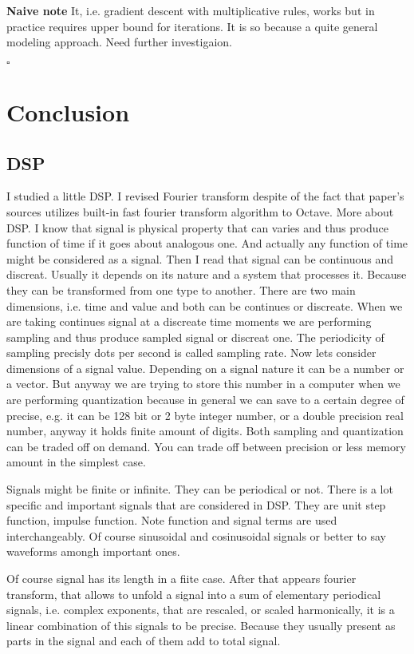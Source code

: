 \documentclass[oneside, final, 14pt]{extarticle}
\begin{document}
\textbf{Naive note}
It, i.e. gradient descent with multiplicative rules,
works but in practice requires
upper bound for iterations. It is so
because a quite general modeling approach.
Need further investigaion.

$\square$

\section{Conclusion}

\subsection{DSP}

	I studied a little DSP. I revised Fourier transform despite of the fact
that paper's sources utilizes built-in fast fourier transform algorithm to
Octave. More about DSP. I know that signal is physical property that can varies
and thus produce function of time if it goes about analogous one. And actually
any function of time might be considered as a signal. Then I read that signal
can be continuous and discreat. Usually it depends on its nature and a system
that processes it. Because they can be transformed from one type to another.
There are two main dimensions, i.e. time and value and both can be continues or
discreate. When we are taking continues signal at a discreate time moments we
are performing sampling and thus produce sampled signal or discreat one. The
periodicity of sampling precisly dots per second is called sampling rate. Now
lets consider dimensions of a signal value. Depending on a signal nature it can
be a number or a vector. But anyway we are trying to store this number in a
computer when we are performing quantization because in general we can save to
a certain degree of precise, e.g. it can be 128 bit or 2 byte integer number,
or a double precision real number, anyway it holds finite amount of digits.
Both sampling and quantization can be traded off on demand. You can trade off
between precision or less memory amount in the simplest case.

Signals might be finite or infinite. They can be periodical or not. There is a
lot specific and important signals that are considered in DSP. They are unit
step function, impulse function. Note function and signal terms are used
interchangeably. Of course sinusoidal and cosinusoidal signals or better to say
waveforms amongh important ones.

Of course signal has its length in a fiite case. After that appears fourier
transform, that allows to unfold a signal into a sum of elementary periodical
signals, i.e. complex exponents, that are rescaled, or scaled harmonically, it
is a linear combination of this signals to be precise. Because they usually
present as parts in the signal and each of them add to total signal.
\end{document}
